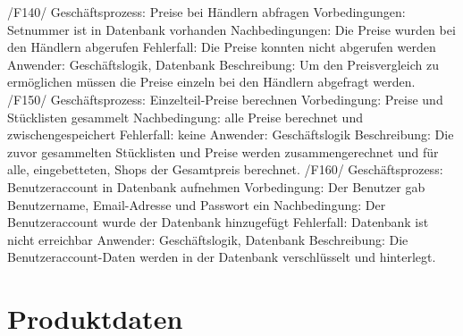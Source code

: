 /F140/ \newline
Geschäftsprozess: Preise bei Händlern abfragen \newline
Vorbedingungen: Setnummer ist in Datenbank vorhanden \newline
Nachbedingungen: Die Preise wurden bei den Händlern abgerufen \newline
Fehlerfall: Die Preise konnten nicht abgerufen werden \newline
Anwender: Geschäftslogik, Datenbank \newline
Beschreibung: Um den Preisvergleich zu ermöglichen müssen die Preise einzeln bei den Händlern abgefragt werden. \newline \newline
/F150/ \newline
Geschäftsprozess: Einzelteil-Preise berechnen \newline
Vorbedingung: Preise und Stücklisten gesammelt \newline
Nachbedingung: alle Preise berechnet und zwischengespeichert\newline
Fehlerfall: keine \newline
Anwender: Geschäftslogik \newline
Beschreibung: Die zuvor gesammelten Stücklisten und Preise werden zusammengerechnet und für alle, eingebetteten, Shops der Gesamtpreis berechnet. \newline \newline
/F160/ \newline
Geschäftsprozess: Benutzeraccount in Datenbank aufnehmen \newline
Vorbedingung: Der Benutzer gab Benutzername, Email-Adresse und Passwort ein \newline
Nachbedingung: Der Benutzeraccount wurde der Datenbank hinzugefügt \newline
Fehlerfall: Datenbank ist nicht erreichbar \newline
Anwender: Geschäftslogik, Datenbank \newline
Beschreibung: Die Benutzeraccount-Daten werden in der Datenbank verschlüsselt und hinterlegt.
\newline \newline

\section{Produktdaten}
